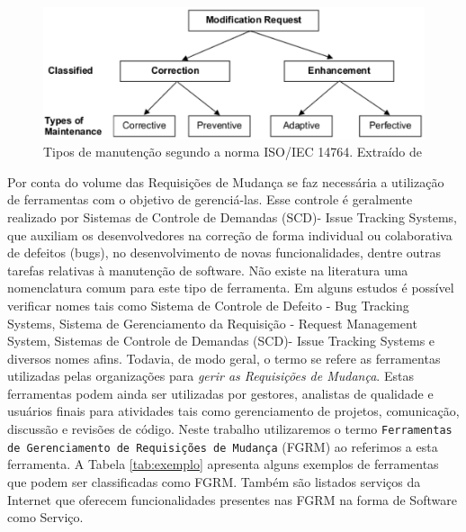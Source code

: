 \documentclass[msc]{ppgccufmg} %
\begin{document}
\begin{figure}[hbtp]
\centering
\includegraphics[width=.75\textwidth]{../img/modification_request.eps}
\caption{Tipos de manutenção segundo a norma ISO/IEC 14764. Extraído de
  \cite{1703974}}
\label{fig:modification-request}
\end{figure}


Por conta do volume das Requisições de Mudança se faz necessária a utilização de ferramentas com o objetivo de gerenciá-las. Esse controle é geralmente realizado por Sistemas de Controle de Demandas (SCD)- Issue Tracking Systems, que auxiliam os desenvolvedores na correção de forma individual ou colaborativa de defeitos (bugs), no desenvolvimento de novas funcionalidades, dentre outras tarefas relativas à manutenção de software. Não existe na literatura uma nomenclatura comum para este tipo de ferramenta. Em alguns estudos é possível verificar nomes tais como Sistema de Controle de Defeito - Bug Tracking Systems, Sistema de Gerenciamento da Requisição - Request Management System, Sistemas de Controle de Demandas (SCD)- Issue Tracking Systems e diversos nomes afins. Todavia, de modo geral, o termo se refere as ferramentas utilizadas pelas organizações para \textit{gerir as Requisições de Mudança}. Estas ferramentas podem ainda ser utilizadas por gestores, analistas de qualidade e usuários finais para atividades tais como gerenciamento de projetos, comunicação, discussão e revisões de código. Neste trabalho utilizaremos o termo \texttt{Ferramentas de Gerenciamento de Requisições de Mudança} (FGRM) ao referimos a esta ferramenta. A Tabela \ref{tab:exemplo} apresenta alguns exemplos de ferramentas que podem ser classificadas como FGRM. Também são listados serviços da Internet que oferecem funcionalidades presentes nas FGRM na forma de Software como Serviço.
\end{document}
